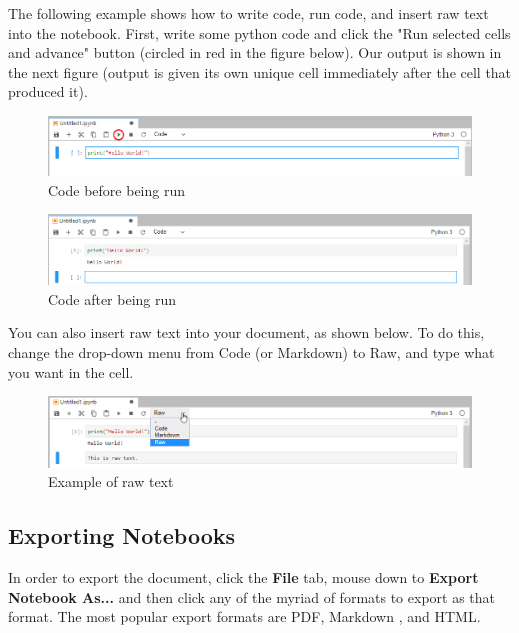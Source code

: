\documentclass[pdftex,12pt]{artikel3}
\begin{document}
The following example shows how to write code, run code, and insert raw text into the notebook. First, write some python code and click the "Run selected cells and advance" button (circled in red in the figure below). Our output is shown in the next figure (output is given its own unique cell immediately after the cell that produced it).

\begin{figure}[h!]
    \centering
    \includegraphics[width=15cm]{code_before_running.png}
    \caption{Code before being run}
    \label{fig:codebeforerunning}
\end{figure}

\begin{figure}[h!]
    \centering
    \includegraphics[width=15cm]{code_after_running.png}
    \caption{Code after being run}
    \label{fig:codeafterrunning}
\end{figure}

You can also insert raw text into your document, as shown below. To do this, change the drop-down menu from Code (or Markdown) to Raw, and type what you want in the cell.

\begin{figure}[h!]
    \centering
    \includegraphics[width=15cm]{raw_text_example.png}
    \caption{Example of raw text}
    \label{fig:rawtextexample}
\end{figure}

\subsection{Exporting Notebooks}
In order to export the document, click the \textbf{File} tab, mouse down to \textbf{Export Notebook As...} and then click any of the myriad of formats to export as that format. The most popular export formats are PDF, Markdown , and HTML. 
\end{document}
